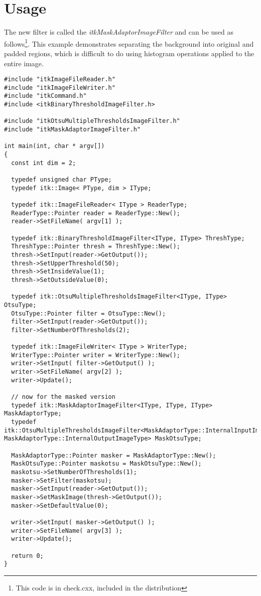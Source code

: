 \documentclass{InsightArticle}
\begin{document}
\section{Usage}
The new filter is called the {\em itkMaskAdaptorImageFilter} and can
be used as follows\footnote{This code is in check.cxx, included in the
distribution}. This example demonstrates separating the background
into original and padded regions, which is difficult to do using
histogram operations applied to the entire image.
\small \begin{verbatim}
#include "itkImageFileReader.h"
#include "itkImageFileWriter.h"
#include "itkCommand.h"
#include <itkBinaryThresholdImageFilter.h>

#include "itkOtsuMultipleThresholdsImageFilter.h"
#include "itkMaskAdaptorImageFilter.h"

int main(int, char * argv[])
{
  const int dim = 2;

  typedef unsigned char PType;
  typedef itk::Image< PType, dim > IType;

  typedef itk::ImageFileReader< IType > ReaderType;
  ReaderType::Pointer reader = ReaderType::New();
  reader->SetFileName( argv[1] );

  typedef itk::BinaryThresholdImageFilter<IType, IType> ThreshType;
  ThreshType::Pointer thresh = ThreshType::New();
  thresh->SetInput(reader->GetOutput());
  thresh->SetUpperThreshold(50);
  thresh->SetInsideValue(1);
  thresh->SetOutsideValue(0);

  typedef itk::OtsuMultipleThresholdsImageFilter<IType, IType> OtsuType;
  OtsuType::Pointer filter = OtsuType::New();
  filter->SetInput(reader->GetOutput());
  filter->SetNumberOfThresholds(2);

  typedef itk::ImageFileWriter< IType > WriterType;
  WriterType::Pointer writer = WriterType::New();
  writer->SetInput( filter->GetOutput() );
  writer->SetFileName( argv[2] );
  writer->Update();

  // now for the masked version
  typedef itk::MaskAdaptorImageFilter<IType, IType, IType> MaskAdaptorType;
  typedef itk::OtsuMultipleThresholdsImageFilter<MaskAdaptorType::InternalInputImageType, MaskAdaptorType::InternalOutputImageType> MaskOtsuType;

  MaskAdaptorType::Pointer masker = MaskAdaptorType::New();
  MaskOtsuType::Pointer maskotsu = MaskOtsuType::New();
  maskotsu->SetNumberOfThresholds(1);
  masker->SetFilter(maskotsu);
  masker->SetInput(reader->GetOutput());
  masker->SetMaskImage(thresh->GetOutput());
  masker->SetDefaultValue(0);

  writer->SetInput( masker->GetOutput() );
  writer->SetFileName( argv[3] );
  writer->Update();

  return 0;
}
\end{verbatim} \normalsize
\end{document}
